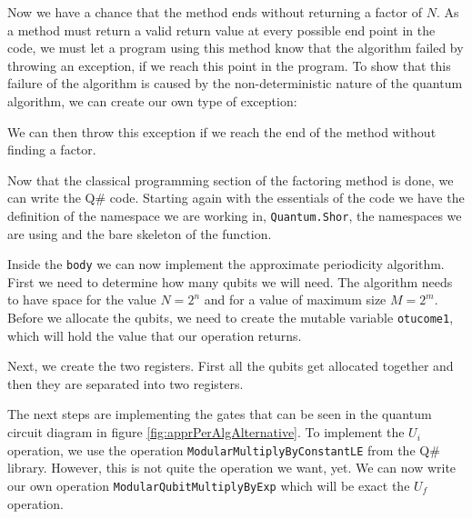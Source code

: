 

Now we have a chance that the method ends without returning a factor of $N$. As a method must return a valid return value at every possible end point in the code, we must let a program using this method know that the algorithm failed by throwing an exception, if we reach this point in the program. To show that this failure of the algorithm is caused by the non-deterministic nature of the quantum algorithm, we can create our own type of exception:



We can then throw this exception if we reach the end of the method without finding a factor.



Now that the classical programming section of the factoring method is done, we can write the Q\# code.
Starting again with the essentials of the code we have the definition of the namespace we are working in, \texttt{Quantum.Shor}, the namespaces we are using and the bare skeleton of the function.



Inside the \texttt{body} we can now implement the approximate periodicity algorithm. First we need to determine how many qubits we will need. The algorithm needs to have space for the value $N = 2^n$ and for a value of maximum size $M = 2^m$. Before we allocate the qubits, we need to create the mutable variable \texttt{otucome1}, which will hold the value that our operation returns. 



Next, we create the two registers. First all the qubits get allocated together and then they are separated into two registers. 



The next steps are implementing the gates that can be seen in the quantum circuit diagram in figure \ref{fig:apprPerAlgAlternative}. To implement the $U_i$ operation, we use the operation \texttt{ModularMultiplyByConstantLE} from the Q\# library. However, this is not quite the operation we want, yet. We can now write our own operation \texttt{ModularQubitMultiplyByExp} which will be exact the $U_f$ operation. 

